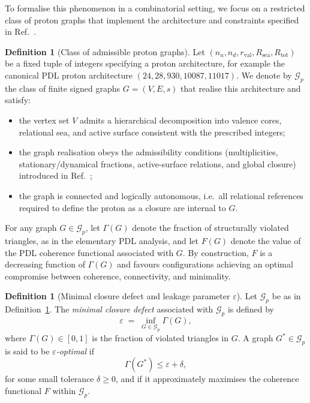 \documentclass[11pt,a4paper]{article}
\theoremstyle{definition}
\newtheorem{definition}[theorem]{Definition}
\begin{document}
To formalise this phenomenon in a combinatorial setting, we focus on a restricted class of proton graphs that implement the architecture and constraints specified in Ref.~\cite{Combinatorial_Proton_v2_2026}.

\begin{definition}[Class of admissible proton graphs]
\label{def:class_Gp}
Let $(n_u, n_d, r_{\mathrm{val}}, R_{\mathrm{sea}}, R_{\mathrm{tot}})$ be a fixed tuple of integers specifying a proton architecture, for example the canonical PDL proton architecture $(24, 28, 930, 10087, 11017)$.\cite{Combinatorial_Proton_v2_2026} We denote by $\mathcal{G}_p$ the class of finite signed graphs $G = (V, E, s)$ that realise this architecture and satisfy:
\begin{itemize}
  \item the vertex set $V$ admits a hierarchical decomposition into valence cores, relational sea, and active surface consistent with the prescribed integers;
  \item the graph realisation obeys the admissibility conditions (multiplicities, stationary/dynamical fractions, active-surface relations, and global closure) introduced in Ref.~\cite{Combinatorial_Proton_v2_2026};
  \item the graph is connected and logically autonomous, i.e.\ all relational references required to define the proton as a closure are internal to $G$.\cite{PDL_Main_2026,PDL_Global_Mapping_2026}
\end{itemize}
\end{definition}

For any graph $G \in \mathcal{G}_p$, let $\Gamma(G)$ denote the fraction of structurally violated triangles, as in the elementary PDL analysis,\cite{PDL_Main_2026,Harary1953} and let $F(G)$ denote the value of the PDL coherence functional associated with $G$.\cite{PDL_Main_2026,PDL_Global_Mapping_2026} By construction, $F$ is a decreasing function of $\Gamma(G)$ and favours configurations achieving an optimal compromise between coherence, connectivity, and minimality.\cite{PDL_Main_2026}

\begin{definition}[Minimal closure defect and leakage parameter $\varepsilon$]
\label{def:epsilon}
Let $\mathcal{G}_p$ be as in Definition~\ref{def:class_Gp}. The \emph{minimal closure defect} associated with $\mathcal{G}_p$ is defined by
\[
 \varepsilon \;=\; \inf_{G \in \mathcal{G}_p} \Gamma(G),
\]
where $\Gamma(G) \in [0,1]$ is the fraction of violated triangles in $G$. A graph $G^\ast \in \mathcal{G}_p$ is said to be \emph{$\varepsilon$-optimal} if
\[
 \Gamma(G^\ast) \leq \varepsilon + \delta,
\]
for some small tolerance $\delta \geq 0$, and if it approximately maximises the coherence functional $F$ within $\mathcal{G}_p$.\cite{Combinatorial_Proton_v2_2026,PDL_Global_Mapping_2026}
\end{definition}
\end{document}
